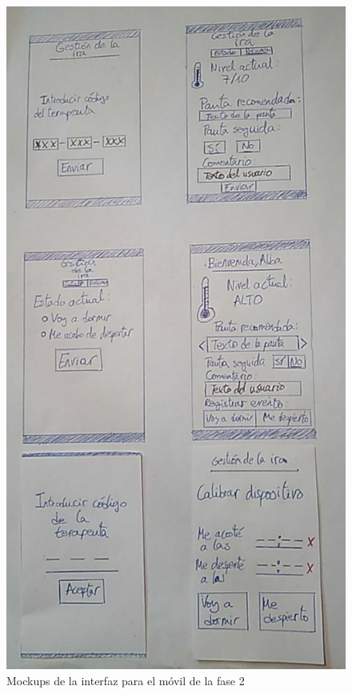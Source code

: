 \begin{figure}[!htbp]
    \centering
    \includegraphics[scale=0.6]{Imagenes/anxA1.jpg}
    \caption[Mockups de la interfaz para el móvil de la fase 2]{Mockups de la interfaz para el móvil de la fase 2}
    \label{fig:mockup1}
\end{figure}

